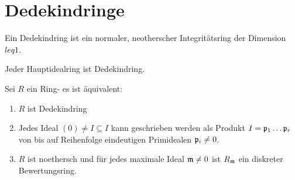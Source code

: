 \section{Dedekindringe}
\begin{Def} Ein Dedekindring ist ein normaler, neotherscher Integritätsring der Dimension  \(leq 1\).
	
	
\end{Def}
\begin{Bsp} Jeder Hauptidealring ist Dedekindring.
	
\end{Bsp}
\begin{Satz} Sei \(R\) ein Ring- es ist äquivalent:
	\begin{enumerate}
		\item \(R\) ist Dedekindring
		\item Jedes Ideal \((0)\neq I\subseteq I\) kann geschrieben werden als Produkt \(I=\mathfrak{p}_1\dots \mathfrak{p}_r\) von 
		bis auf Reihenfolge eindeutigen Primidealen \(\mathfrak{p}_i\neq 0\).
		\item \(R\) ist noethersch und für jedes maximale Ideal \(\mathfrak{m}\neq 0\) ist \(R_{\mathfrak{m}}\) ein diskreter Bewertungsring.
		

\end{enumerate}
\end{Satz}
